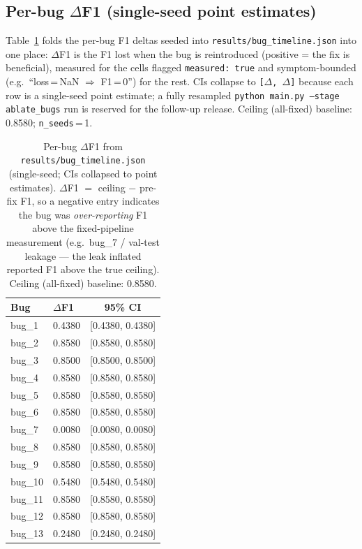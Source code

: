\documentclass[conference]{IEEEtran}
\begin{document}
\subsection{Per-bug $\Delta$F1 (single-seed point estimates)}\label{sec:bug_ablation}

Table~\ref{tab:bug_ablation} folds the per-bug F1 deltas seeded into
\texttt{results/bug\_timeline.json} into one place: $\Delta$F1 is the
F1 lost when the bug is reintroduced (positive = the fix is
beneficial), measured for the cells flagged
\texttt{measured:\,true} and symptom-bounded (e.g.\ ``loss\,=\,NaN
$\Rightarrow$ F1\,=\,0'') for the rest.  CIs collapse to
\texttt{[$\Delta$,\,$\Delta$]} because each row is a single-seed
point estimate; a fully resampled
\texttt{python\,main.py\,--stage\,ablate\_bugs} run is reserved for
the follow-up release.  Ceiling (all-fixed) baseline:
0.8580; \texttt{n\_seeds}\,=\,1.

\begin{table}[t]
  \caption{Per-bug $\Delta$F1 from \texttt{results/bug\_timeline.json}
    (single-seed; CIs collapsed to point estimates).  $\Delta$F1 $=$
    ceiling $-$ pre-fix F1, so a negative entry indicates the bug was
    \emph{over-reporting} F1 above the fixed-pipeline measurement
    (e.g.\ bug\_7 / val-test leakage --- the leak inflated reported F1
    above the true ceiling).  Ceiling (all-fixed) baseline:
    0.8580.}\label{tab:bug_ablation}
  \centering
  \small
  \begin{tabular}{llc}\toprule
    Bug & $\Delta$F1 & 95\% CI \\ \midrule
    bug\_1 & 0.4380 & [0.4380, 0.4380] \\
    bug\_2 & 0.8580 & [0.8580, 0.8580] \\
    bug\_3 & 0.8500 & [0.8500, 0.8500] \\
    bug\_4 & 0.8580 & [0.8580, 0.8580] \\
    bug\_5 & 0.8580 & [0.8580, 0.8580] \\
    bug\_6 & 0.8580 & [0.8580, 0.8580] \\
    bug\_7 & 0.0080 & [0.0080, 0.0080] \\
    bug\_8 & 0.8580 & [0.8580, 0.8580] \\
    bug\_9 & 0.8580 & [0.8580, 0.8580] \\
    bug\_10 & 0.5480 & [0.5480, 0.5480] \\
    bug\_11 & 0.8580 & [0.8580, 0.8580] \\
    bug\_12 & 0.8580 & [0.8580, 0.8580] \\
    bug\_13 & 0.2480 & [0.2480, 0.2480] \\
    \bottomrule
  \end{tabular}
\end{table}
\end{document}
